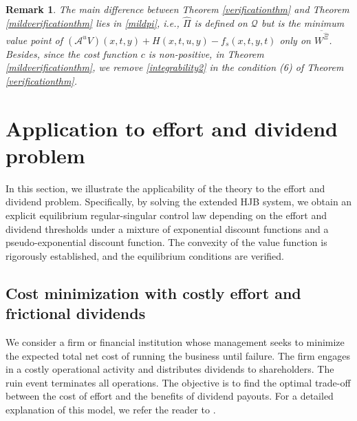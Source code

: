 \documentclass[11pt,reqno]{article}%
\newtheorem{remark}[theorem]{Remark}
\numberwithin{equation}{section}
\begin{document}
\begin{remark}\label{difference}
The main difference between Theorem \ref{verificationthm} and Theorem \ref{mildverificationthm} lies in \eqref{mildpi}, i.e., $\hat\Pi$ is defined on $\mathcal{Q}$ but is the minimum value point of $\left(\mathcal{A}^{u}V\right)(x,t,y)+H(x,t,u,y)-f_s(x,t,y,t)$ only on $\overline{W^{\hat{\Xi}}}$. Besides, since the cost function $c$ is non-positive, in Theorem \ref{mildverificationthm}, we remove \eqref{integrability2} in the condition (6) of Theorem \ref{verificationthm}.
\end{remark}



\section{Application to effort and dividend problem}\label{Application}
In this section, we illustrate the applicability of the theory to the effort and dividend problem. Specifically, by solving the extended HJB system, we obtain an explicit equilibrium regular-singular control law depending on the effort and dividend thresholds under a mixture of exponential discount functions and a pseudo-exponential discount function. The convexity of the value function is rigorously established, and the equilibrium conditions are verified.
\subsection{Cost minimization with costly effort and frictional dividends}
We consider a firm or financial institution whose management seeks to minimize the expected total net cost of running the business until failure. The firm engages in a costly operational activity and distributes dividends to shareholders. The ruin event terminates all operations. The objective is to find the optimal trade-off between the cost of effort and the benefits of dividend payouts. For a detailed explanation of this model, we refer the reader to \citet{cadenillas2007optimal}.
\end{document}
